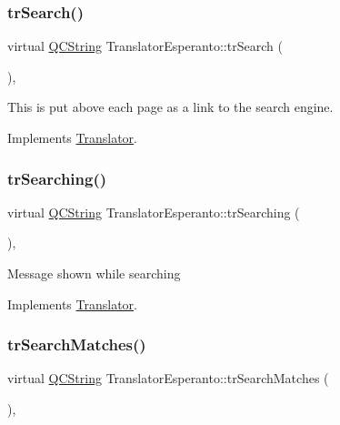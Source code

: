 \subsubsection{\texorpdfstring{trSearch()}{trSearch()}}
{\footnotesize\ttfamily virtual \mbox{\hyperlink{class_q_c_string}{Q\+C\+String}} Translator\+Esperanto\+::tr\+Search (\begin{DoxyParamCaption}{ }\end{DoxyParamCaption})\hspace{0.3cm}{\ttfamily [inline]}, {\ttfamily [virtual]}}

This is put above each page as a link to the search engine. 

Implements \mbox{\hyperlink{class_translator}{Translator}}.

\mbox{\label{class_translator_esperanto_acb3030e8a7b1bb0aa477ba4ddf8c4a5c}} 
\subsubsection{\texorpdfstring{trSearching()}{trSearching()}}
{\footnotesize\ttfamily virtual \mbox{\hyperlink{class_q_c_string}{Q\+C\+String}} Translator\+Esperanto\+::tr\+Searching (\begin{DoxyParamCaption}{ }\end{DoxyParamCaption})\hspace{0.3cm}{\ttfamily [inline]}, {\ttfamily [virtual]}}

Message shown while searching 

Implements \mbox{\hyperlink{class_translator}{Translator}}.

\mbox{\label{class_translator_esperanto_a58dbaf7411a0a85d50d71868c4b19cca}} 
\subsubsection{\texorpdfstring{trSearchMatches()}{trSearchMatches()}}
{\footnotesize\ttfamily virtual \mbox{\hyperlink{class_q_c_string}{Q\+C\+String}} Translator\+Esperanto\+::tr\+Search\+Matches (\begin{DoxyParamCaption}{ }\end{DoxyParamCaption})\hspace{0.3cm}{\ttfamily [inline]}, {\ttfamily [virtual]}}

